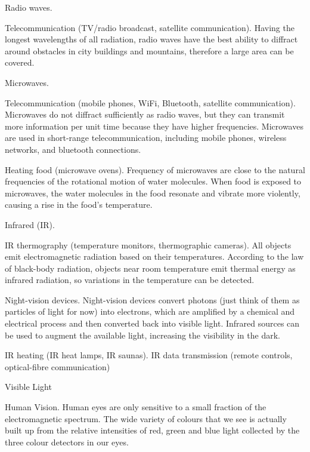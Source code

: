 \documentclass[a4paper,12pt]{book}
\newcommand{\xskip}{\hspace{1em}}
\begin{document}
\begin{compactitem}
	\item[--] Radio waves.
	
	\xskip Telecommunication (TV/radio broadcast, satellite communication). Having the longest wavelengths of all radiation, radio waves have the best ability to diffract around obstacles in city buildings and mountains, therefore a large area can be covered.

	\item[--] Microwaves.
	
	\xskip Telecommunication (mobile phones, WiFi, Bluetooth, satellite communication). Microwaves do not diffract sufficiently as radio waves, but they can transmit more information per unit time because they have higher frequencies. Microwaves are used in short-range telecommunication, including mobile phones, wireless networks, and bluetooth connections.
		
		
	\xskip Heating food (microwave ovens). Frequency of microwaves are close to the natural frequencies of the rotational motion of water molecules. When food is exposed to microwaves, the water molecules in the food resonate and vibrate more violently, causing a rise in the food's temperature.
	
	\item[--] Infrared (IR).
	
	\xskip IR thermography (temperature monitors, thermographic cameras). All objects emit electromagnetic radiation based on their temperatures. According to the law of black-body radiation, objects near room temperature emit thermal energy as infrared radiation, so variations in the temperature can be detected.
	
	\xskip Night-vision devices. Night-vision devices convert photons (just think of them as particles of light for now) into electrons, which are amplified by a chemical and electrical process and then converted back into visible light. Infrared sources can be used to augment the available light, increasing the visibility in the dark.
	
	\xskip IR heating (IR heat lamps, IR saunas). 	
	\xskip IR data transmission (remote controls, optical-fibre communication)	
	\item[--] Visible Light
	
	\xskip Human Vision. Human eyes are only sensitive to a small fraction of the electromagnetic spectrum. The wide variety of colours that we see is actually built up from the relative intensities of red, green and blue light collected by the three colour detectors in our eyes.
	

\end{compactitem}
\end{document}
